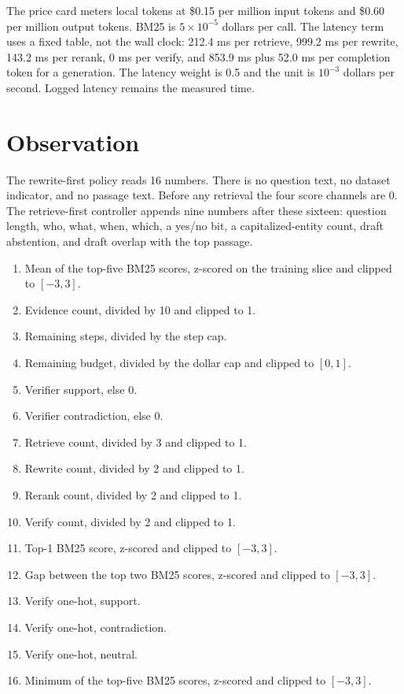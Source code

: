 \documentclass[letterpaper]{article}
\begin{document}
The price card meters local tokens at \$0.15 per million input tokens and \$0.60 per million output tokens. BM25 is \(5\times 10^{-5}\) dollars per call. The latency term uses a fixed table, not the wall clock: 212.4 ms per retrieve, 999.2 ms per rewrite, 143.2 ms per rerank, 0 ms per verify, and 853.9 ms plus 52.0 ms per completion token for a generation. The latency weight is 0.5 and the unit is \(10^{-3}\) dollars per second. Logged latency remains the measured time.

\FloatBarrier
\section{Observation}
The rewrite-first policy reads 16 numbers. There is no question text, no dataset indicator, and no passage text. Before any retrieval the four score channels are 0. The retrieve-first controller appends nine numbers after these sixteen: question length, who, what, when, which, a yes/no bit, a capitalized-entity count, draft abstention, and draft overlap with the top passage.
\begin{enumerate}
\item Mean of the top-five BM25 scores, z-scored on the training slice and clipped to \([-3, 3]\).
\item Evidence count, divided by 10 and clipped to 1.
\item Remaining steps, divided by the step cap.
\item Remaining budget, divided by the dollar cap and clipped to \([0, 1]\).
\item Verifier support, else 0.
\item Verifier contradiction, else 0.
\item Retrieve count, divided by 3 and clipped to 1.
\item Rewrite count, divided by 2 and clipped to 1.
\item Rerank count, divided by 2 and clipped to 1.
\item Verify count, divided by 2 and clipped to 1.
\item Top-1 BM25 score, z-scored and clipped to \([-3, 3]\).
\item Gap between the top two BM25 scores, z-scored and clipped to \([-3, 3]\).
\item Verify one-hot, support.
\item Verify one-hot, contradiction.
\item Verify one-hot, neutral.
\item Minimum of the top-five BM25 scores, z-scored and clipped to \([-3, 3]\).
\end{enumerate}
\end{document}

